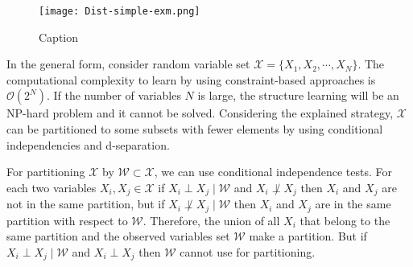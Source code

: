 \documentclass{article}
\newcommand{\X}{\mathcal{X}}
\newcommand{\W}{\mathcal{W}}
\begin{document}
\begin{figure}[!ht]
    \centering
    \texttt{[image: Dist-simple-exm.png]}
    \caption{Caption}
    \label{f-simple}
\end{figure}


In the general form, consider random variable set $\X = \{X_1, X_2,\cdots, X_N \}$. The computational complexity to learn by using constraint-based  approaches is $\mathcal{O}(2^N)$.  If the number of variables $N$ is large, the structure learning will be an NP-hard problem and it cannot be solved. 
Considering the explained strategy, $\X$ can be partitioned to some subsets with fewer elements by using conditional independencies and d-separation. 

For partitioning $\X$ by $\W \subset \X$, we can use conditional independence tests. For each two variables $X_i,X_j \in \X$ if $X_i\perp X_j \mid \W$ and $X_i\not\perp X_j$ then $X_i$ and $X_j$ are not in the same partition, but if $X_i\not \perp X_j \mid \W$ then $X_i$ and $X_j$ are in the same partition with respect to $\W$.
Therefore, the union of all $X_i$ that belong to the same partition and the observed variables set $\W$ make a partition. 
But if $X_i\perp X_j \mid \W$ and $X_i\perp X_j$ then $\W$ cannot use for partitioning.
\end{document}
